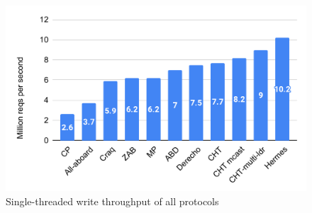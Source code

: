 \begin{figure}[t]
  \centering
  \includegraphics[scale=0.4]{1_figures/single-thread.pdf}
  \caption{Single-threaded write throughput of all protocols}
  \label{fig:single-thr}
\end{figure}